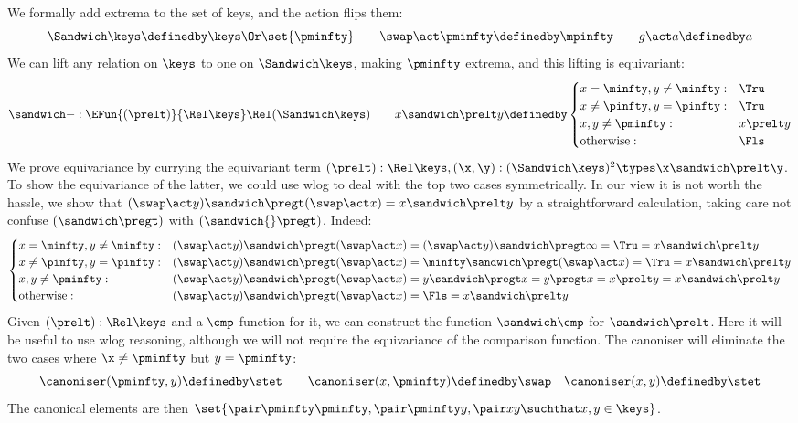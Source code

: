 We formally add extrema to the set of keys, and the action flips them:
\[
\Sandwich\keys \definedby
\keys \Or \set{\pminfty}
\qquad
\swap \act \pminfty \definedby \mpinfty \qquad
g \act a \definedby a
\]
We can lift any relation on $\keys$ to one on $\Sandwich\keys$, making
$\pminfty$ extrema, and this lifting is equivariant:
\[
\sandwich- : \EFun{(\prelt)}{\Rel\keys} \Rel(\Sandwich\keys)
\qquad
x \sandwich\prelt y \definedby \begin{cases}
  x = \minfty, y \neq \minfty: & \Tru \\
  x \neq \pinfty, y = \pinfty: & \Tru \\
  x,y \neq \pminfty: & x \prelt y \\
  \text{otherwise}: & \Fls
\end{cases}
\]
We prove equivariance by currying the equivariant term
$(\prelt) : \Rel \keys, (\x,\y) : (\Sandwich\keys)^2 \types \x
\sandwich\prelt \y$. To show the equivariance of the latter, we could
use wlog to deal with the top two cases symmetrically. In our
view it is not worth the hassle, we show that
$(\swap \act y)\sandwich\pregt (\swap \act x) = x
\sandwich\prelt y$ by a straightforward calculation,
taking care not confuse $(\sandwich\pregt)$ with
$(\sandwich{}\pregt)$. Indeed:
\[
\begin{cases}
  x = \minfty, y \neq \minfty: &  (\swap \act y)\sandwich\pregt (\swap \act x)
  = (\swap\act y) \sandwich\pregt \infty = \Tru = x \sandwich\prelt y \\
  x \neq \pinfty, y = \pinfty: & (\swap \act y)\sandwich\pregt (\swap \act x)
  = \minfty \sandwich\pregt (\swap\act x) = \Tru
  = x \sandwich\prelt y
  \\
  x,y \neq \pminfty: & (\swap \act y)\sandwich\pregt (\swap \act x)
  = y \sandwich\pregt x = y \pregt x = x \prelt y
  = x \sandwich\prelt y
  \\
  \text{otherwise}: & (\swap \act y)\sandwich\pregt (\swap \act x)
  = \Fls
  = x \sandwich\prelt y
\end{cases}
\]
Given $(\prelt) : \Rel\keys$ and a $\cmp$ function for it, we can
construct the function $\sandwich\cmp$ for $\sandwich\prelt$. Here
it will be useful to use wlog reasoning, although we will not require
the equivariance of the comparison function. The canoniser will eliminate
the two cases where $\x \neq \pminfty$ but $y = \pminfty$:
\[
  \canoniser(\pminfty, y) \definedby \stet\qquad
  \canoniser(x, \pminfty) \definedby \swap\quad
  \canoniser(x,y) \definedby \stet
\]
The canonical elements are then
$\set{\pair\pminfty\pminfty, \pair\pminfty y, \pair xy \suchthat x,y \in \keys}$.
